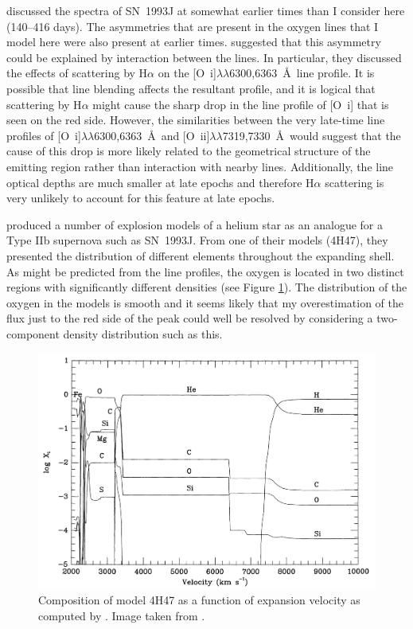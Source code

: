 \citet{Houck1996} discussed the spectra of SN~1993J at somewhat earlier times than I consider here (140--416 days).  The asymmetries that are present in the oxygen lines that I model here were also present at earlier times.  \citet{Houck1996} suggested that  this asymmetry could be explained by interaction between the lines.  In particular, they discussed the effects of scattering by H$\alpha$ on the [O~{\sc i}]$\lambda\lambda$6300,6363~\AA\ line profile.  It is possible that line blending affects the resultant profile, and it is logical that scattering by H$\alpha$ might cause the sharp drop in the line profile of [O~{\sc i}] that is seen on the red side.  However, the similarities between the very late-time line profiles of [O~{\sc i}]$\lambda\lambda$6300,6363~\AA\ and [O~{\sc ii}]$\lambda\lambda$7319,7330~\AA\ would suggest that  the cause of this drop is more likely related to the geometrical structure of the emitting region rather than interaction with nearby lines.  Additionally, the line optical depths are much smaller at late epochs and therefore H$\alpha$ scattering is very unlikely to account for this feature at late epochs.

\citet{Nomoto1993} produced a number of explosion models of a helium star as an analogue for a Type IIb supernova such as SN~1993J.  From one of their models (4H47), they presented the  distribution of different elements throughout the expanding shell.  As might be predicted from the line profiles, the oxygen is located in two distinct regions with significantly different densities (see Figure \ref{4h47}).   The distribution of the oxygen in the models is smooth and it seems likely that my overestimation of the flux just to the red side of the peak could well be resolved by considering a two-component density distribution such as this.

\begin{figure}
\centering
\includegraphics[scale=0.4,clip=true, trim=30 0 0 0]{chapters/chapter6/figs/93J/explosion_model.png}
\caption{Composition of model 4H47 as a function of expansion velocity as computed by \citet{Nomoto1993}.  Image taken from \citet{Houck1996}.}
\label{4h47}
\end{figure}


